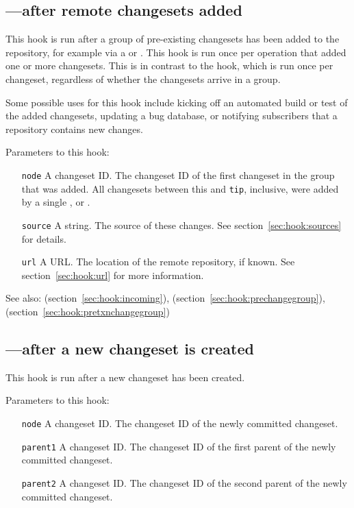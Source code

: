\subsection{---after remote changesets added}
\label{sec:hook:changegroup}

This hook is run after a group of pre-existing changesets has been
added to the repository, for example via a  or
.  This hook is run once per operation that added one
or more changesets.  This is in contrast to the  hook,
which is run once per changeset, regardless of whether the changesets
arrive in a group.

Some possible uses for this hook include kicking off an automated
build or test of the added changesets, updating a bug database, or
notifying subscribers that a repository contains new changes.

Parameters to this hook:
\begin{itemize}
\item[\texttt{node}] A changeset ID.  The changeset ID of the first
  changeset in the group that was added.  All changesets between this
  and \texttt{tip}, inclusive, were added by
  a single ,  or .
\item[\texttt{source}] A string.  The source of these changes.  See
  section~\ref{sec:hook:sources} for details.
\item[\texttt{url}] A URL.  The location of the remote repository, if
  known.  See section~\ref{sec:hook:url} for more information.
\end{itemize}

See also:  (section~\ref{sec:hook:incoming}),
 (section~\ref{sec:hook:prechangegroup}),
 (section~\ref{sec:hook:pretxnchangegroup})

\subsection{---after a new changeset is created}
\label{sec:hook:commit}

This hook is run after a new changeset has been created.

Parameters to this hook:
\begin{itemize}
\item[\texttt{node}] A changeset ID.  The changeset ID of the newly
  committed changeset.
\item[\texttt{parent1}] A changeset ID.  The changeset ID of the first
  parent of the newly committed changeset.
\item[\texttt{parent2}] A changeset ID.  The changeset ID of the second
  parent of the newly committed changeset.
\end{itemize}

